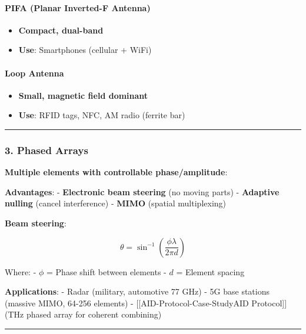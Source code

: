 \paragraph{PIFA (Planar Inverted-F
Antenna)}\label{pifa-planar-inverted-f-antenna}

\begin{itemize}
\tightlist
\item
  \textbf{Compact, dual-band}
\item
  \textbf{Use}: Smartphones (cellular + WiFi)
\end{itemize}

\paragraph{Loop Antenna}\label{loop-antenna}

\begin{itemize}
\tightlist
\item
  \textbf{Small, magnetic field dominant}
\item
  \textbf{Use}: RFID tags, NFC, AM radio (ferrite bar)
\end{itemize}

\begin{center}\rule{0.5\linewidth}{0.5pt}\end{center}

\subsubsection{3. Phased Arrays}\label{phased-arrays}

\textbf{Multiple elements with controllable phase/amplitude}:

\textbf{Advantages}: - \textbf{Electronic beam steering} (no moving
parts) - \textbf{Adaptive nulling} (cancel interference) - \textbf{MIMO}
(spatial multiplexing)

\textbf{Beam steering}:

\[
\theta = \sin^{-1}\left(\frac{\phi \lambda}{2\pi d}\right)
\]

Where: - \(\phi\) = Phase shift between elements - \(d\) = Element
spacing

\textbf{Applications}: - Radar (military, automotive 77 GHz) - 5G base
stations (massive MIMO, 64-256 elements) -
{[}{[}AID-Protocol-Case-Study\textbar AID Protocol{]}{]} (THz phased
array for coherent combining)

\begin{center}\rule{0.5\linewidth}{0.5pt}\end{center}

